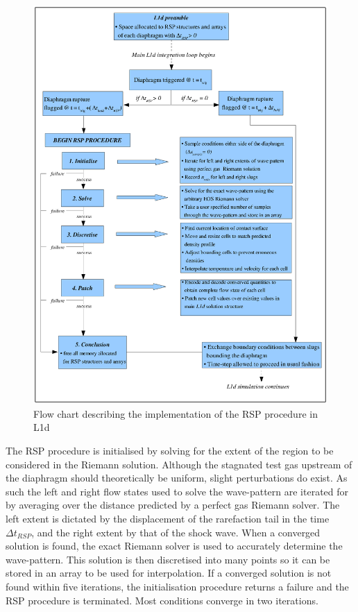 \documentclass[a4paper,10pt]{article}
\begin{document}
\begin{figure}[hcb]
\centering
\includegraphics[scale=0.8]{figs/RSP_flow_chart.eps}
\caption{Flow chart describing the implementation of the RSP procedure in L1d}
\label{fig:RSP_flow_chart}
\end{figure}

\par \medskip

The RSP procedure is initialised by solving for the extent of the region to be considered in the Riemann solution.  Although the stagnated test gas upstream of the diaphragm should theoretically be uniform, slight perturbations do exist.  As such the left and right flow states used to solve the wave-pattern are iterated for by averaging over the distance predicted by a perfect gas Riemann solver.  The left extent is dictated by the displacement of the rarefaction tail in the time $\Delta t_{RSP}$, and the right extent by that of the shock wave.  When a converged solution is found, the exact Riemann solver is used to accurately determine the wave-pattern.  This solution is then discretised into many points so it can be stored in an array to be used for interpolation.  If a converged solution is not found within five iterations, the initialisation procedure returns a failure and the RSP procedure is terminated.  Most conditions converge in two iterations.
\end{document}
